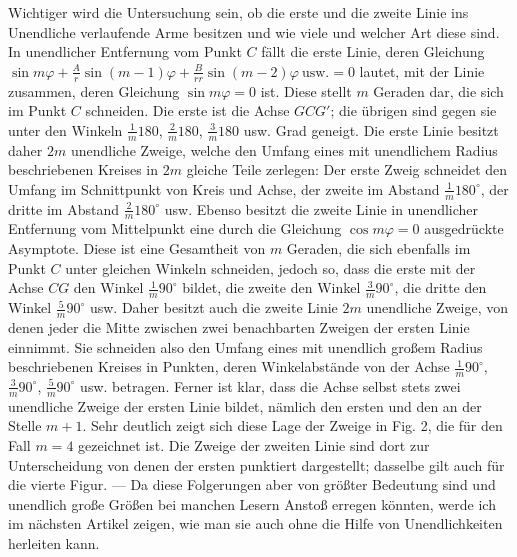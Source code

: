 Wichtiger wird die Untersuchung sein, ob die erste und die zweite Linie ins Unendliche verlaufende Arme besitzen und wie viele und welcher Art diese sind. In unendlicher Entfernung vom Punkt $C$ fällt die erste Linie, deren Gleichung $\sin m\varphi+\frac{A}{r}\sin(m-1)\varphi+\frac{B}{rr}\sin(m-2)\varphi\ \text{usw.}=0$ lautet, mit der Linie zusammen, deren Gleichung $\sin m\varphi=0$ ist. Diese stellt $m$ Geraden dar, die sich im Punkt $C$ schneiden. Die erste ist die Achse $GCG'$; die übrigen sind gegen sie unter den Winkeln $\frac{1}{m}180$, $\frac{2}{m}180$, $\frac{3}{m}180$ usw. Grad geneigt. Die erste Linie besitzt daher $2m$ unendliche Zweige, welche den Umfang eines mit unendlichem Radius beschriebenen Kreises in $2m$ gleiche Teile zerlegen: Der erste Zweig schneidet den Umfang im Schnittpunkt von Kreis und Achse, der zweite im Abstand $\frac{1}{m}180^{\circ}$, der dritte im Abstand $\frac{2}{m}180^{\circ}$ usw. Ebenso besitzt die zweite Linie in unendlicher Entfernung vom Mittelpunkt eine durch die Gleichung $\cos m\varphi=0$ ausgedrückte Asymptote. Diese ist eine Gesamtheit von $m$ Geraden, die sich ebenfalls im Punkt $C$ unter gleichen Winkeln schneiden, jedoch so, dass die erste mit der Achse $CG$ den Winkel $\frac{1}{m}90^{\circ}$ bildet, die zweite den Winkel $\frac{3}{m}90^{\circ}$, die dritte den Winkel $\frac{5}{m}90^{\circ}$ usw. Daher besitzt auch die zweite Linie $2m$ unendliche Zweige, von denen jeder die Mitte zwischen zwei benachbarten Zweigen der ersten Linie einnimmt. Sie schneiden also den Umfang eines mit unendlich großem Radius beschriebenen Kreises in Punkten, deren Winkelabstände von der Achse $\frac{1}{m}90^{\circ}$, $\frac{3}{m}90^{\circ}$, $\frac{5}{m}90^{\circ}$ usw. betragen. Ferner ist klar, dass die Achse selbst stets zwei unendliche Zweige der ersten Linie bildet, nämlich den ersten und den an der Stelle $m+1$. Sehr deutlich zeigt sich diese Lage der Zweige in Fig. 2, die für den Fall $m=4$ gezeichnet ist. Die Zweige der zweiten Linie sind dort zur Unterscheidung von denen der ersten punktiert dargestellt; dasselbe gilt auch für die vierte Figur. --- Da diese Folgerungen aber von größter Bedeutung sind und unendlich große Größen bei manchen Lesern Anstoß erregen könnten, werde ich im nächsten Artikel zeigen, wie man sie auch ohne die Hilfe von Unendlichkeiten herleiten kann.
